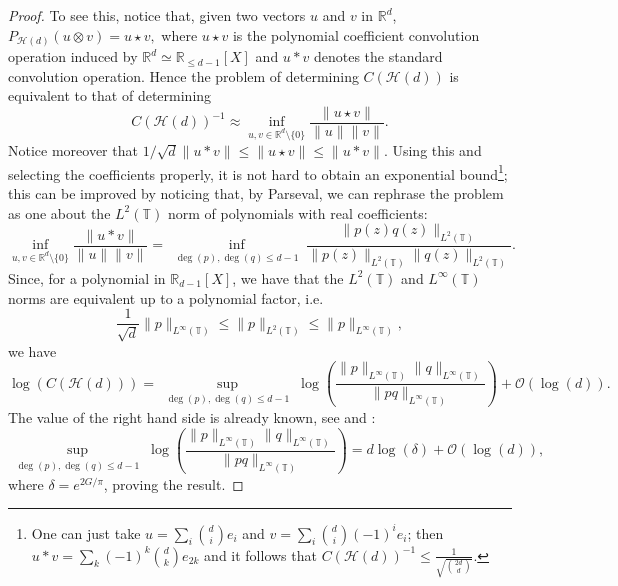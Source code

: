 \documentclass[11pt, a4paper, reqno]{elsarticle}
\theoremstyle{definition}
\theoremstyle{remark}
\begin{document}
\begin{proof}
To see this, notice that, given two vectors $u$ and $v$ in $\mathbb{R}^d$, 
$ P_{\mathcal H(d)}(u\otimes v)=u\star v,$ where $u\star v$ is the polynomial coefficient convolution
operation induced by $\mathbb{R}^d\simeq \mathbb{R}_{\le d-1}[X]$ and $u*v$ denotes the standard convolution operation. Hence the problem of determining $C(\mathcal H(d))$
is equivalent to that of determining
\begin{equation*}
    C(\mathcal H(d))^{-1}\approx \inf_{u,v\in \mathbb{R}^d\setminus\{0\}} \frac{\|u\star v\|}{\|u\|\|v\|}.
\end{equation*}
Notice moreover that $1/\sqrt{d}\|u*v\|\le \|u\star v\|\le  
\|u*v\|$.
Using this and selecting the coefficients properly, it is not hard to obtain an exponential bound\footnote{One can just take $u=\sum_i \binom{d}{i}e_i$ and $v=\sum_i\binom{d}{i}(-1)^i e_i$; then $u*v=\sum_k (-1)^k\binom{d}{k}e_{2k}$
and it follows that $C(\mathcal H(d))^{-1}\le \frac{1}{\sqrt{\binom{2d}{d}}}$.};
this can be improved by noticing that, by Parseval, we can rephrase the problem as one about the $L^2(\mathbb{T})$
norm of polynomials with real coefficients:
\begin{equation*}
   \inf_{u,v\in \mathbb{R}^d\setminus\{0\}}\frac{\|u*v\|}{\|u\|\|v\|}=\underset{\substack{\deg(p),\deg(q)\le d-1}}{\inf}\frac{\|p(z)q(z)\|_{L^2(\mathbb{T})}}{\|p(z)\|_{L^2(\mathbb{T})}\|q(z)\|_{L^2(\mathbb{T})}}.
\end{equation*}
Since, for a polynomial in 
$\mathbb{R}_{d-1}[X]$, we have
that the $L^2(\mathbb T)$ and $L^\infty(\mathbb T)$ norms are equivalent
up to a polynomial factor, i.e.
\begin{equation*}
    \frac1{\sqrt d}\|p\|_{L^\infty(\mathbb T)}
    \le \|p\|_{L^2(\mathbb T)}\le
    \|p\|_{L^\infty(\mathbb{T})},
\end{equation*}
we have
\begin{equation*}
    \log\left(C(\mathcal H(d))\right)=\underset{\substack{\deg(p),\deg(q)\le d-1}}{\sup} \log\left(\frac{\|p\|_{L^\infty(\mathbb{T})}\|q\|_{L^\infty(\mathbb{T})}}{\|pq\|_{L^\infty(\mathbb{T})}}\right)+\mathcal O(\log(d)).
\end{equation*}
The value of the right hand side is already known, see \cite[Theorem 2, Remark 2]{Boyd}
and \cite[corollary 2.8, Theorem 2.9, Remark 2.10]{RumpSekigawa2010}:
\begin{equation*}
   \underset{\substack{\deg(p),\deg(q)\le d-1}}{\sup} \log\left(\frac{\|p\|_{L^\infty(\mathbb{T})}\|q\|_{L^\infty(\mathbb{T})}}{\|pq\|_{L^\infty(\mathbb{T})}}\right) =d\log(\delta)
    +\mathcal O(\log(d)),
\end{equation*}
where $\delta=e^{2G/\pi}$, proving the result.
\end{proof}
\end{document}
